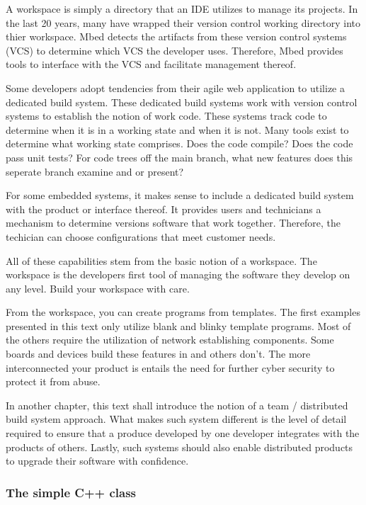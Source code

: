 \documentclass{article}
\begin{document}
A workspace is simply a directory that an IDE utilizes to manage its projects.  In the last 20 years, many have wrapped their version control working directory into thier workspace.  Mbed detects the artifacts from these version control systems (VCS) to determine which VCS the developer uses. Therefore, Mbed provides tools to interface with the VCS and facilitate management thereof.  

Some developers adopt tendencies from their agile web application to utilize a dedicated build system.  These dedicated build systems work with version control systems to establish the notion of work code.  These systems track code to determine when it is in a working state and when it is not.  Many tools exist to determine what working state comprises.  Does the code compile?  Does the code pass unit tests?  For code trees off the main branch, what new features does this seperate branch examine and or present?

For some embedded systems, it makes sense to include a dedicated build system with the product or interface thereof.  It provides users and technicians a mechanism to determine versions software that work together.  Therefore, the techician can choose configurations that meet customer needs.

All of these capabilities stem from the basic notion of a workspace.  The workspace is the developers first tool of managing the software they develop on any level.  Build your workspace with care.

From the workspace, you can create programs from templates.  The first examples presented in this text only utilize blank and blinky template programs.  Most of the others require the utilization of network establishing components.  Some boards and devices build these features in and others don't.  The more interconnected your product is entails the need for further cyber security to protect it from abuse.

In another chapter, this text shall introduce the notion of a team / distributed build system approach.  What makes such system different is the level of detail required to ensure that a produce developed by one developer integrates with the products of others.  Lastly, such systems should also enable distributed products to upgrade their software with confidence. 


\subsubsection{The simple C++ class} %
\label{ssub:the_simple_c_class}
\end{document}
